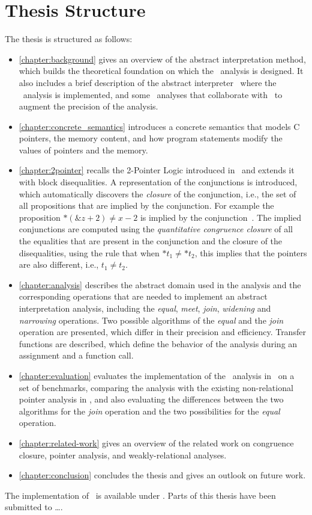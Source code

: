 \section{Thesis Structure}

The thesis is structured as follows:
\begin{itemize}
    \item \cref{chapter:background} gives an overview of the abstract interpretation method, which builds the theoretical foundation on which the \cpo\ analysis is designed.
          It also includes a brief description of the abstract interpreter \goblint\, where the \cpo\ analysis is implemented, and some \goblint\ analyses that collaborate with \cpo\ to augment the precision of the analysis.
    \item \cref{chapter:concrete_semantics} introduces a concrete semantics that models C pointers, the memory content, and how program statements modify the values of pointers and the memory.
    \item \cref{chapter:2pointer} recalls the 2-Pointer Logic introduced in~\cite{2pointer} and extends it with block disequalities.
          A representation of the conjunctions is introduced, which automatically discovers the \emph{closure} of the conjunction,
          i.e., the set of all propositions that are implied by the conjunction.
          For example the proposition $*(\&z + 2) \neq x - 2$ is implied by the conjunction~.
          The implied conjunctions are computed using the \emph{quantitative congruence closure} of all the equalities that are present in the conjunction and
          the closure of the disequalities, using the rule that when $*t_1 \neq *t_2$, this implies that the pointers are also different, i.e., $t_1 \neq t_2$.
    \item \cref{chapter:analysis} describes the abstract domain used in the analysis and the corresponding operations that are needed to implement an abstract interpretation analysis, including the \emph{equal}, \emph{meet}, \emph{join}, \emph{widening} and \emph{narrowing} operations.
          Two possible algorithms of the \emph{equal} and the \emph{join} operation are presented, which differ in
          their precision and efficiency.
          Transfer functions are described, which define the behavior of the analysis during an assignment and a function call.
    \item \cref{chapter:evaluation} evaluates the implementation of the \cpo\ analysis in \goblint\ on a set of benchmarks,
          comparing the analysis with the existing non-relational pointer analysis in \goblint, and also
          evaluating the differences between the two algorithms for the \emph{join} operation and the two possibilities for the \emph{equal} operation.
    \item \cref{chapter:related-work} gives an overview of the related work on congruence closure, pointer analysis, and weakly-relational analyses.
    \item \cref{chapter:conclusion} concludes the thesis and gives an outlook on future work.
\end{itemize}

The implementation of \cpo\ is available under . Parts of this thesis have been submitted to \dots.
